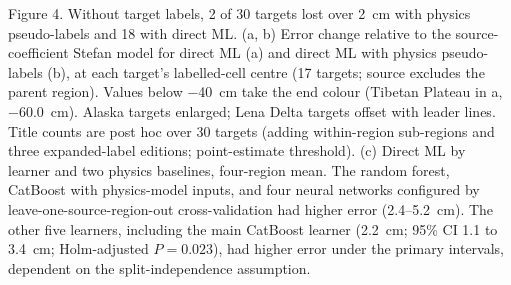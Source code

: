 \medskip

\noindent Figure 4. Without target labels, 2 of 30 targets lost over 2~cm with physics pseudo-labels and 18 with direct ML.
(a, b) Error change relative to the source-coefficient Stefan model for direct ML (a) and direct ML with physics pseudo-labels (b), at each target's labelled-cell centre (17 targets; source excludes the parent region).
Values below −40~cm take the end colour (Tibetan Plateau in a, −60.0~cm).
Alaska targets enlarged; Lena Delta targets offset with leader lines.
Title counts are post hoc over 30 targets (adding within-region sub-regions and three expanded-label editions; point-estimate threshold).
(c) Direct ML by learner and two physics baselines, four-region mean.
The random forest, CatBoost with physics-model inputs, and four neural networks configured by leave-one-source-region-out cross-validation had higher error (2.4--5.2~cm).
The other five learners, including the main CatBoost learner (2.2~cm; 95\% CI 1.1 to 3.4~cm; Holm-adjusted $P = 0.023$), had higher error under the primary intervals, dependent on the split-independence assumption.
